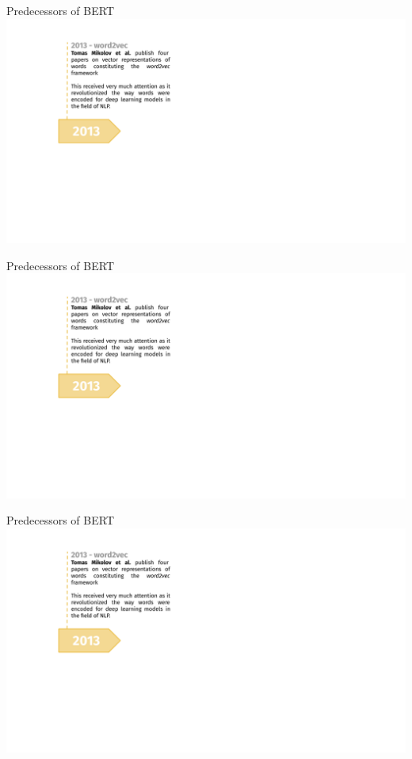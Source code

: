 \documentclass[]{beamer}
\begin{document}
\begin{frame}{Predecessors of BERT}
\hbox{\hspace{-4.5em} \includegraphics[width=14cm,page=1]{figure/transfer_learning_timeline1_nlp.pdf}}
\end{frame}
\begin{frame}[noframenumbering]{Predecessors of BERT}
\hbox{\hspace{-4.5em} \includegraphics[width=14cm,page=2]{figure/transfer_learning_timeline1_nlp.pdf}}
\end{frame}
\begin{frame}[noframenumbering]{Predecessors of BERT}
\hbox{\hspace{-4.5em} \includegraphics[width=14cm,page=3]{figure/transfer_learning_timeline1_nlp.pdf}}
\end{frame}
\end{document}
